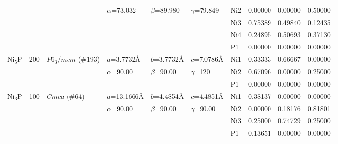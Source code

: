 \documentclass[twoside,twocolumn,9pt]{article}
\begin{document}
\begin{table}[t]
\begin{tabular*}{\textwidth}{@{\extracolsep{\fill}}llllllllll}
               &     &               & $\alpha$=73.032 & $\beta$=89.980 & $\gamma$=79.849    & Ni2 &  0.00000 & 0.00000 & 0.50000 \\
               &     &               &                  &                 &                  & Ni3 &  0.75389 & 0.49840 & 0.12435 \\
               &     &               &                  &                 &                  & Ni4 &  0.24895 & 0.50693 & 0.37130 \\
               &     &               &                  &                 &                  & P1  &  0.00000 & 0.00000 & 0.00000 \\
\midrule
    Ni$_{5}$P  & 200 & $P6_3/mcm$ (\#193)  & $a$=3.7732\AA    & $b$=3.7732\AA   & $c$=7.0786\AA    & Ni1 & 0.33333   &  0.66667  &   0.00000  \\
               &     &                    & $\alpha$=90.00   & $\beta$=90.00 & $\gamma$=120       & Ni2 & 0.67096   &  0.00000  &   0.25000  \\
               &     &                    &                  &                 &                  & P1 &  0.00000    & 0.00000   &  0.00000  \\
\midrule
    Ni$_{3}$P  & 100 & $Cmca$ (\#64) & $a$=13.1666\AA   & $b$=4.4854\AA   & $c$=4.4851\AA    & Ni1 & 0.38137   &  0.00000  &   0.00000  \\
               &     &               & $\alpha$=90.00   & $\beta$=90.00   & $\gamma$=90.00   & Ni2 & 0.00000   &  0.18176  &   0.81801  \\
               &     &               &                  &                 &                  & Ni3 & 0.25000   &  0.74729  &   0.25000  \\   
               &     &               &                  &                 &                  & P1 &  0.13651    & 0.00000   &  0.00000  \\
\hline
  \end{tabular*}
\end{table}
\end{document}
